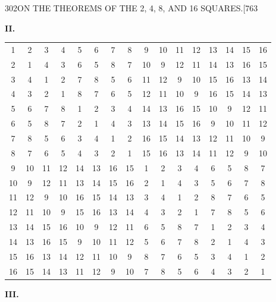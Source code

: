 \documentclass[11pt]{article}
\begin{document}
\begin{center}
{\small 302\hfill ON THE THEOREMS OF THE 2, 4, 8, AND 16 SQUARES.\hfill [763}
\end{center}

\begin{center}\textbf{II.}\end{center}

\begin{center}
\begin{tabular}{cccc|cccc|cccc|cccc}
1 & 2 & 3 & 4 & 5 & 6 & 7 & 8 & 9 & 10 & 11 & 12 & 13 & 14 & 15 & 16 \\
2 & 1 & 4 & 3 & 6 & 5 & 8 & 7 & 10 & 9 & 12 & 11 & 14 & 13 & 16 & 15 \\
3 & 4 & 1 & 2 & 7 & 8 & 5 & 6 & 11 & 12 & 9 & 10 & 15 & 16 & 13 & 14 \\
4 & 3 & 2 & 1 & 8 & 7 & 6 & 5 & 12 & 11 & 10 & 9 & 16 & 15 & 14 & 13 \\
\hline
5 & 6 & 7 & 8 & 1 & 2 & 3 & 4 & 14 & 13 & 16 & 15 & 10 & 9 & 12 & 11 \\
6 & 5 & 8 & 7 & 2 & 1 & 4 & 3 & 13 & 14 & 15 & 16 & 9 & 10 & 11 & 12 \\
7 & 8 & 5 & 6 & 3 & 4 & 1 & 2 & 16 & 15 & 14 & 13 & 12 & 11 & 10 & 9 \\
8 & 7 & 6 & 5 & 4 & 3 & 2 & 1 & 15 & 16 & 13 & 14 & 11 & 12 & 9 & 10 \\
\hline
9 & 10 & 11 & 12 & 14 & 13 & 16 & 15 & 1 & 2 & 3 & 4 & 6 & 5 & 8 & 7 \\
10 & 9 & 12 & 11 & 13 & 14 & 15 & 16 & 2 & 1 & 4 & 3 & 5 & 6 & 7 & 8 \\
11 & 12 & 9 & 10 & 16 & 15 & 14 & 13 & 3 & 4 & 1 & 2 & 8 & 7 & 6 & 5 \\
12 & 11 & 10 & 9 & 15 & 16 & 13 & 14 & 4 & 3 & 2 & 1 & 7 & 8 & 5 & 6 \\
\hline
13 & 14 & 15 & 16 & 10 & 9 & 12 & 11 & 6 & 5 & 8 & 7 & 1 & 2 & 3 & 4 \\
14 & 13 & 16 & 15 & 9 & 10 & 11 & 12 & 5 & 6 & 7 & 8 & 2 & 1 & 4 & 3 \\
15 & 16 & 13 & 14 & 12 & 11 & 10 & 9 & 8 & 7 & 6 & 5 & 3 & 4 & 1 & 2 \\
16 & 15 & 14 & 13 & 11 & 12 & 9 & 10 & 7 & 8 & 5 & 6 & 4 & 3 & 2 & 1 \\
\end{tabular}
\end{center}

\begin{center}\textbf{III.}\end{center}
\end{document}
